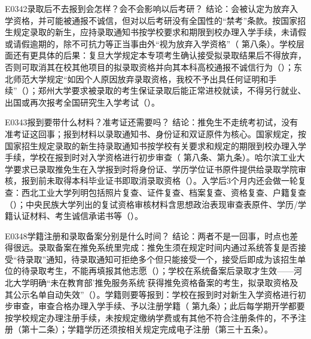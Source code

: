 \begin{qa}{E0342}{录取后不去报到会怎样？会不会影响以后考研？}
结论：会被认定为放弃入学资格，并可能被通报不诚信，但对以后考研没有全国性的“禁考”条款。按国家招生规定录取的新生，应持录取通知书按学校要求和期限到校办理入学手续，未请假或请假逾期的，除不可抗力等正当事由外“视为放弃入学资格”（ 第八条）。学校层面还有更具体的后果：复旦大学规定本专项考生确认接受拟录取结果后不得放弃，否则可取消其在校其他项目的拟录取资格并向其本科高校通报不诚信行为（）；东北师范大学规定“如因个人原因放弃录取资格，我校不予出具任何证明和手续”（）；郑州大学要求被录取的考生保证录取后能正常进校就读，不得另行就业、出国或再次报考全国研究生入学考试（）。
\end{qa}

\begin{qa}{E0343}{报到要带什么材料？准考证还需要吗？}
结论：推免生不走统考初试，没有准考证这回事；报到材料以录取通知书、身份证和双证原件为核心。国家规定，按国家招生规定录取的新生持录取通知书按学校有关要求和规定的期限到校办理入学手续，学校在报到时对入学资格进行初步审查（ 第八条、第九条）。哈尔滨工业大学要求已录取推免生在入学报到时将身份证、学历学位证书原件提供给录取学院审核，报到前未取得本科毕业证书即取消录取资格（）。入学后3个月内还会做一轮复查：西北工业大学列明包括照片复查、证件复查、档案复查、资格复查、户籍复查（）；中央民族大学列出的复试资格审核材料含思想政治表现审查表原件、学历/学籍认证材料、考生诚信承诺书等（）。
\end{qa}

\begin{qa}{E0348}{学籍注册和录取备案分别是什么时间？}
结论：两者不是一回事，时点也差得很远。录取备案在推免系统里完成：推免生须在规定时间内通过系统答复是否接受“待录取”通知，待录取通知可拒绝多个但只能接受一个，接受后即成为该招生单位的待录取考生，不能再填报其他志愿（）；学校在系统备案后录取才生效——河北大学明确“未在教育部'推免服务系统'获得推免资格备案的考生，拟录取资格及其公示名单自动失效”（）。学籍则要等报到：学校在报到时对新生入学资格进行初步审查，审查合格办理入学手续、予以注册学籍（ 第九条）；此后每学期开学都要按学校规定办理注册手续，未按规定缴纳学费或有其他不符合注册条件的，不予注册（第十二条）；学籍学历还须按相关规定完成电子注册（第三十五条）。
\end{qa}

